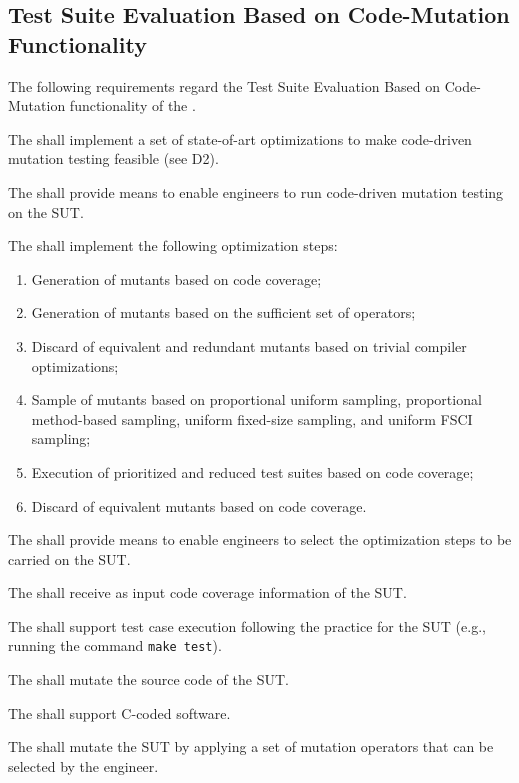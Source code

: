 

\subsection{Test Suite Evaluation Based on Code-Mutation Functionality}
\label{sec:codeDriven}

The following requirements regard the Test Suite Evaluation Based on Code-Mutation functionality of the \FAQAS.

\RQ{} The \FAQAS shall implement a set of state-of-art optimizations to make code-driven mutation testing feasible (see D2).

\RQ{} The \FAQAS shall provide means to enable engineers to run code-driven mutation testing on the SUT.

\RQ{} The \FAQAS shall implement the following optimization steps:
\begin{enumerate}
	\item Generation of mutants based on code coverage;
	\item Generation of mutants based on the sufficient set of operators;
	\item Discard of equivalent and redundant mutants based on trivial compiler optimizations;
	\item Sample of mutants based on proportional uniform sampling, proportional method-based sampling, uniform fixed-size sampling, and uniform FSCI sampling;
	\item Execution of prioritized and reduced test suites based on code coverage;
	\item Discard of equivalent mutants based on code coverage.
\end{enumerate}

\RQ{} The \FAQAS shall provide means to enable engineers to select the optimization steps to be carried on the SUT.

\RQ{} The \FAQAS shall receive as input code coverage information of the SUT.

\RQ{} The \FAQAS shall support test case execution following the practice for the SUT (e.g., running the command \texttt{make test}).

\RQ{} The \FAQAS shall mutate the source code of the SUT.

\RQ{} The \FAQAS shall support C-coded software.

\RQ{} The \FAQAS shall mutate the SUT by applying a set of mutation operators that can be selected by the engineer.

